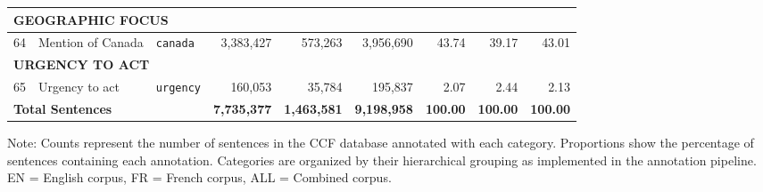 \documentclass[12pt]{article}
\renewcommand\_{\texttt{\detokenize{_}\allowbreak}}
\begin{document}
{\begin{longtable}{p{0.5cm}p{4.0cm}p{2.5cm}rrrrrr}
\midrule
\multicolumn{9}{l}{\cellcolor{gray!10}\textbf{GEOGRAPHIC FOCUS}} \\
\midrule
64 & Mention of Canada & \texttt{canada} & 3,383,427 & 573,263 & 3,956,690 & 43.74 & 39.17 & 43.01 \\
\midrule
\multicolumn{9}{l}{\cellcolor{gray!10}\textbf{URGENCY TO ACT}} \\
\midrule
65 & Urgency to act & \texttt{urgency} & 160,053 & 35,784 & 195,837 & 2.07 & 2.44 & 2.13 \\
\bottomrule
\multicolumn{3}{l}{\textbf{Total Sentences}} & \textbf{7,735,377} & \textbf{1,463,581} & \textbf{9,198,958} & \textbf{100.00} & \textbf{100.00} & \textbf{100.00} \\
\bottomrule
\end{longtable}
}

\vspace{0.5em}
\noindent\footnotesize
Note: Counts represent the number of sentences in the CCF database annotated with each category. Proportions show the percentage of sentences containing each annotation. Categories are organized by their hierarchical grouping as implemented in the annotation pipeline. EN = English corpus, FR = French corpus, ALL = Combined corpus.
\endlandscape

\printbibliography[title={References}]
\end{document}
